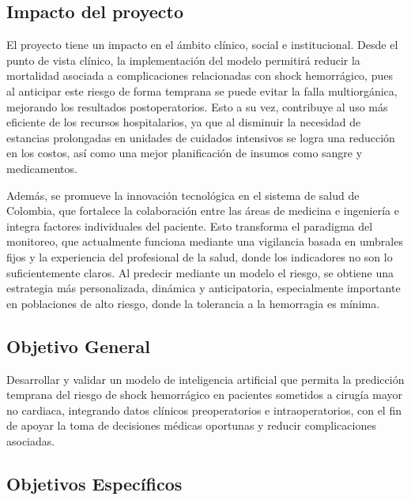 \subsection{Impacto del proyecto}

El proyecto tiene un impacto en el ámbito clínico, social e institucional. Desde el punto de vista clínico, la implementación del modelo permitirá reducir la mortalidad asociada a complicaciones relacionadas con shock hemorrágico, pues al anticipar este riesgo de forma temprana se puede evitar la falla multiorgánica, mejorando los resultados postoperatorios. Esto a su vez, contribuye al uso más eficiente de los recursos hospitalarios, ya que al disminuir la necesidad de estancias prolongadas en unidades de cuidados intensivos se logra una reducción en los costos, así como una mejor planificación de insumos como sangre y medicamentos.

Además, se promueve la innovación tecnológica en el sistema de salud de Colombia, que fortalece la colaboración entre las áreas de medicina e ingeniería e integra factores individuales del paciente. Esto transforma el paradigma del monitoreo, que actualmente funciona mediante una vigilancia basada en umbrales fijos y la experiencia del profesional de la salud, donde los indicadores no son lo suficientemente claros. Al predecir mediante un modelo el riesgo, se obtiene una estrategia más personalizada, dinámica y anticipatoria, especialmente importante en poblaciones de alto riesgo, donde la tolerancia a la hemorragia es mínima.

\subsection{Objetivo General}

Desarrollar y validar un modelo de inteligencia artificial que permita la predicción temprana del riesgo de shock hemorrágico en pacientes sometidos a cirugía mayor no cardiaca, integrando datos clínicos preoperatorios e intraoperatorios, con el fin de apoyar la toma de decisiones médicas oportunas y reducir complicaciones asociadas.

\subsection{Objetivos Específicos}

